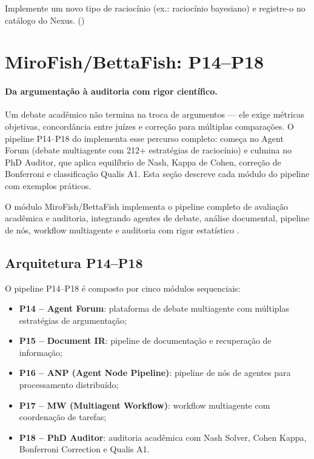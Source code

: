 \begin{exercicio}
Implemente um novo tipo de raciocínio (ex.: raciocínio bayesiano)
e registre-o no catálogo do Nexus. (\nivelphd)
\end{exercicio}

\section{MiroFish/BettaFish: P14--P18}
\label{sec:mirofish}
\nivelphd

\paragraph{Da argumentação à auditoria com rigor científico.} Um debate acadêmico não termina na troca de argumentos — ele exige métricas objetivas, concordância entre juízes e correção para múltiplas comparações. O pipeline P14--P18 do \opencodeeco{} implementa esse percurso completo: começa no Agent Forum (debate multiagente com 212+ estratégias de raciocínio) e culmina no PhD Auditor, que aplica equilíbrio de Nash, Kappa de Cohen, correção de Bonferroni e classificação Qualis A1. Esta seção descreve cada módulo do pipeline com exemplos práticos.

O módulo MiroFish/BettaFish implementa o pipeline completo de avaliação
acadêmica e auditoria, integrando agentes de debate, análise
documental, pipeline de nós, workflow multiagente e auditoria com
rigor estatístico \cite{laranjeira2026opencode,
laranjeira2026gartner, nash1950equilibrium}.

\subsection{Arquitetura P14--P18}
\label{subsec:p14-p18}

O pipeline P14--P18 é composto por cinco módulos sequenciais:

\begin{itemize}
\item \textbf{P14 -- Agent Forum}: plataforma de debate multiagente com
múltiplas estratégias de argumentação;
\item \textbf{P15 -- Document IR}: pipeline de documentação e
recuperação de informação;
\item \textbf{P16 -- ANP (Agent Node Pipeline)}: pipeline de nós de
agentes para processamento distribuído;
\item \textbf{P17 -- MW (Multiagent Workflow)}: workflow multiagente
com coordenação de tarefas;
\item \textbf{P18 -- PhD Auditor}: auditoria acadêmica com Nash
Solver, Cohen Kappa, Bonferroni Correction e Qualis A1.
\end{itemize}

